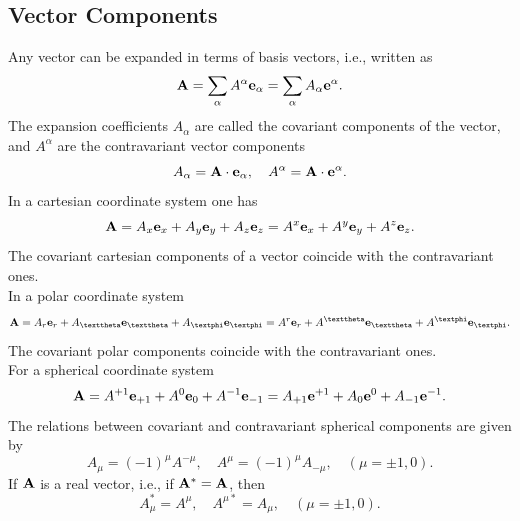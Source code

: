 \subsection{Vector Components}\label{sec:1.2.1}
Any vector can be expanded in terms of basis vectors, i.e., written as
\begin{equation}
\mathbf{A}=\sum_{\alpha} A^{\alpha} \mathbf{e}_{\alpha}=\sum_{\alpha} A_{\alpha} \mathbf{e}^{\alpha} .\label{eq:1:2:1}
\end{equation}
The expansion coefficients \(A_{\alpha}\) are called the covariant components of the vector, and \(A^{\alpha}\) are the contravariant vector components
\begin{equation}
A_{\alpha}=\mathbf{A} \cdot \mathbf{e}_{\alpha}, \quad A^{\alpha}=\mathbf{A} \cdot \mathbf{e}^{\alpha} . \label{eq:1:2:2}
\end{equation}
In a cartesian coordinate system one has
\begin{equation}
\mathbf{A}=A_{x} \mathbf{e}_{x}+A_{y} \mathbf{e}_{y}+A_{z} \mathbf{e}_{z}=A^{x} \mathbf{e}_{x}+A^{y} \mathbf{e}_{y}+A^{z} \mathbf{e}_{z} .\label{eq:1:2:3}
\end{equation}
The covariant cartesian components of a vector coincide with the contravariant ones.\\
In a polar coordinate system
\begin{equation}
\vect{A}=A_{r} \vect{e}_{r}+A_{\vartheta} \vect{e}_{\vartheta}+A_{\varphi} \vect{e}_{\varphi}=A^{r} \vect{e}_{r}+A^{\vartheta} \vect{e}_{\vartheta}+A^{\varphi} \vect{e}_{\varphi} . \label{eq:1:2:4}
\end{equation}
The covariant polar components coincide with the contravariant ones.\\
For a spherical coordinate system
\begin{equation}
\mathbf{A}=A^{+1} \mathbf{e}_{+1}+A^{0} \mathbf{e}_{0}+A^{-1} \mathbf{e}_{-1}=A_{+1} \mathbf{e}^{+1}+A_{0} \mathbf{e}^{0}+A_{-1} \mathbf{e}^{-1}. \label{eq:1:2:5}
\end{equation}
The relations between covariant and contravariant spherical components are given by
\begin{equation}
A_{\mu}=(-1)^{\mu} A^{-\mu}, \quad A^{\mu}=(-1)^{\mu} A_{-\mu}, \quad(\mu= \pm 1,0) . \label{eq:1:2:6}
\end{equation}
If \(\mathbf{A}\) is a real vector, i.e., if \(\mathbf{A}^{*}=\mathbf{A}\), then
\begin{equation}
A_{\mu}^{*}=A^{\mu}, \quad A^{\mu *}=A_{\mu}, \quad(\mu= \pm 1,0) . \label{eq:1:2:7}
\end{equation}
